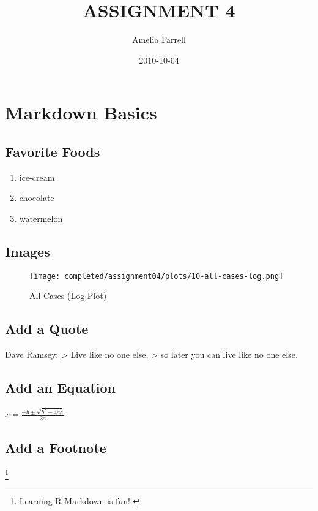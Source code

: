 \documentclass[]{article}
\title{ASSIGNMENT 4}
\author{Amelia Farrell}
\date{2010-10-04}
\providecommand{\tightlist}{%
  \setlength{\itemsep}{0pt}\setlength{\parskip}{0pt}}
\begin{document}
\maketitle

\section{Markdown Basics}\label{markdown-basics}

\subsection{Favorite Foods}\label{favorite-foods}

\begin{enumerate}
\def\labelenumi{\arabic{enumi}.}
\tightlist
\item
  ice-cream
\item
  chocolate
\item
  watermelon
\end{enumerate}

\subsection{Images}\label{images}

\begin{figure}
\centering
\texttt{[image: completed/assignment04/plots/10-all-cases-log.png]}
\caption{All Cases (Log Plot)}
\end{figure}

\subsection{Add a Quote}\label{add-a-quote}

Dave Ramsey: \textgreater{} Live like no one else, \textgreater{} so
later you can live like no one else.

\subsection{Add an Equation}\label{add-an-equation}

\({\displaystyle x={\frac {-b\pm {\sqrt {b^{2}-4ac}}}{2a}}\ \ }\)

\subsection{Add a Footnote}\label{add-a-footnote}

\footnote{Learning R Markdown is fun!.}
\end{document}
